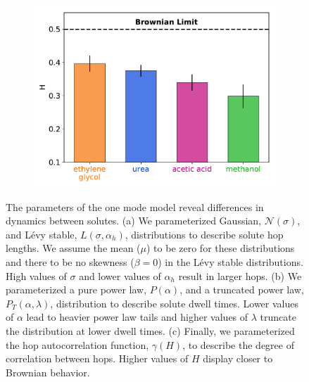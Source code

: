 \documentclass[aps,pre,preprint,groupedaddress]{revtex4-2}
\begin{document}
\begin{figure}
\begin{subfigure}{0.325\textwidth}
  \includegraphics[width=\textwidth]{hurst_barchart.pdf}
  \caption{}\label{fig:hurst_barchart}
  \end{subfigure}
  \caption{The parameters of the one mode model reveal differences in 
    dynamics between solutes.
  (a) We parameterized Gaussian, $\mathcal{N}(\sigma)$, and L\'evy stable, 
  $L(\sigma, \alpha_h)$, distributions to describe solute hop lengths. We assume the 
  mean ($\mu$) to be zero for these distributions and there to be no skewness ($\beta = 0$)
  in the L\'evy stable distributions. High values of $\sigma$ and lower values of $\alpha_h$
  result in larger hops. (b) We parameterized a pure power law, $P(\alpha)$, and a 
  truncated power law, $P_T(\alpha, \lambda)$, distribution to describe solute dwell
  times. Lower values of $\alpha$ lead to heavier power law tails and higher values of 
  $\lambda$ truncate the distribution at lower dwell times. (c) Finally, we parameterized the
  hop autocorrelation function, $\gamma(H)$, to describe the degree of correlation between
  hops. Higher values of $H$ display closer to Brownian behavior.}\label{fig:1mode_parameters}
  \end{figure}
  
\end{document}
